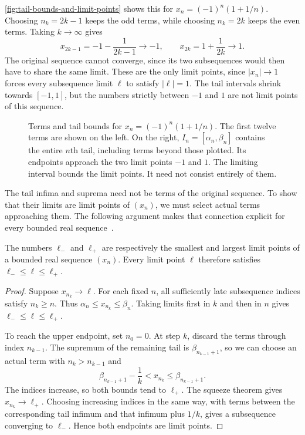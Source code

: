 \autoref{fig:tail-bounds-and-limit-points} shows this for
$x_n=(-1)^n(1+1/n)$. Choosing $n_k=2k-1$ keeps the odd terms, while
choosing $n_k=2k$ keeps the even terms. Taking $k\to\infty$ gives
\[
  x_{2k-1}=-1-\frac{1}{2k-1}\longrightarrow-1,\qquad
  x_{2k}=1+\frac{1}{2k}\longrightarrow1.
\]
The original sequence cannot converge, since its two subsequences would
then have to share the same limit. These are the only limit points,
since $|x_n|\to1$ forces
every subsequence limit $\ell$ to satisfy $|\ell|=1$.
The tail intervals shrink towards $[-1,1]$, but the numbers strictly
between $-1$ and $1$ are not limit points of this sequence.
\begin{figure}[htbp]
  \centering
  
  \caption[Tail bounds and extreme limit points.]{Terms and tail bounds
    for $x_n=(-1)^n(1+1/n)$. The first twelve terms are shown on the left.
    On the right, $I_n=[\alpha_n,\beta_n]$ contains the entire $n$th tail,
    including terms beyond those plotted. Its endpoints approach the two
    limit points $-1$ and $1$. The limiting interval bounds the limit
    points. It need not consist entirely of them.}
  \label{fig:tail-bounds-and-limit-points}
\end{figure}

The tail infima and suprema need not be terms of the original sequence.
To show that their limits are limit points of $(x_n)$, we must select
actual terms approaching them. The following argument makes that
connection explicit for every bounded real
sequence~\cite{Rodriguez2020Limsup}.
\begin{proposition}
  \label{thm:analysis-i:extreme-limit-points}
  The numbers $\ell_-$ and $\ell_+$ are respectively the smallest and
  largest limit points of a bounded real sequence $(x_n)$. Every limit
  point $\ell$ therefore satisfies $\ell_-\leq\ell\leq\ell_+$.
\end{proposition}
\begin{proof}
  Suppose $x_{n_k}\to\ell$. For each fixed $n$, all sufficiently late
  subsequence indices satisfy $n_k\geq n$. Thus
  $\alpha_n\leq x_{n_k}\leq\beta_n$. Taking limits first in $k$ and then
  in $n$ gives $\ell_-\leq\ell\leq\ell_+$.

  To reach the upper endpoint, set $n_0=0$. At step $k$, discard the
  terms through index $n_{k-1}$. The supremum of the remaining tail
  is $\beta_{n_{k-1}+1}$, so we can choose an actual term with
  $n_k>n_{k-1}$ and
  \[
    \beta_{n_{k-1}+1}-\frac1k<x_{n_k}\leq\beta_{n_{k-1}+1}.
  \]
  The indices increase, so both bounds tend to $\ell_+$. The squeeze
  theorem gives $x_{n_k}\to\ell_+$. Choosing increasing indices in the
  same way, with terms between the corresponding tail infimum and that
  infimum plus $1/k$, gives a subsequence converging to $\ell_-$.
  Hence both endpoints are limit points.
\end{proof}

